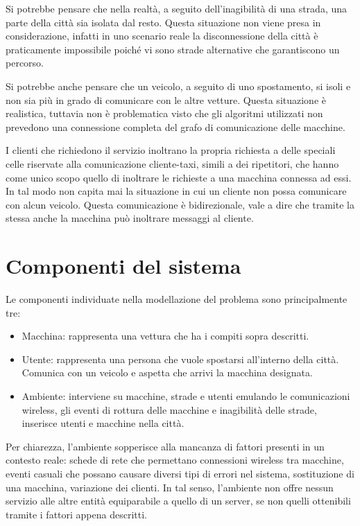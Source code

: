 Si potrebbe pensare che nella realtà, a seguito dell'inagibilità di una strada, una parte della città sia isolata dal resto. Questa situazione non viene presa in considerazione, infatti in uno scenario reale la disconnessione della città è praticamente impossibile poiché vi sono strade alternative che garantiscono un percorso.

Si potrebbe anche pensare che un veicolo, a seguito di uno spostamento, si isoli e non sia più in grado di comunicare con le altre vetture. Questa situazione è realistica, tuttavia non è problematica visto che gli algoritmi utilizzati non prevedono una connessione completa del grafo di comunicazione delle macchine.

I clienti che richiedono il servizio inoltrano la propria richiesta a delle speciali celle riservate alla comunicazione cliente-taxi, simili a dei ripetitori, che hanno come unico scopo quello di inoltrare le richieste a una macchina connessa ad essi. In tal modo non capita mai la situazione in cui un cliente non possa comunicare con alcun veicolo. Questa comunicazione è bidirezionale, vale a dire che tramite la stessa anche la macchina può inoltrare messaggi al cliente.

\section{Componenti del sistema}

Le componenti individuate nella modellazione del problema sono principalmente tre:

\begin{itemize}
	\item Macchina: rappresenta una vettura che ha i compiti sopra descritti.
	\item Utente: rappresenta una persona che vuole spostarsi all'interno della città. Comunica con un veicolo e aspetta che arrivi la macchina designata.
	\item Ambiente: interviene su macchine, strade e utenti emulando le comunicazioni wireless, gli eventi di rottura delle macchine e inagibilità delle strade, inserisce utenti e macchine nella città.
\end{itemize}

Per chiarezza, l'ambiente sopperisce alla mancanza di fattori presenti in un contesto reale: schede di rete che permettano connessioni wireless tra macchine, eventi casuali che possano causare diversi tipi di errori nel sistema, sostituzione di una macchina, variazione dei clienti. In tal senso, l'ambiente non offre nessun servizio alle altre entità equiparabile a quello di un server, se non quelli ottenibili tramite i fattori appena descritti.

